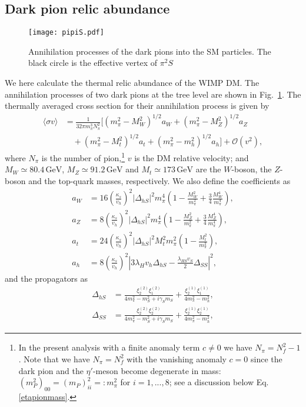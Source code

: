 \documentclass[a4paper,preprint,superscriptaddress,preprintnumbers,nofootinbib]{revtex4}
\newcommand{\al}[1]{\begin{align}#1\end{align}}
\newcommand{\nn}{\nonumber\\}
\newcommand{\fn}[1]{\!\left(#1\right)}
\newcommand{\bra}{\langle}
\newcommand{\ket}{\rangle}
\begin{document}
\subsection{Dark pion relic abundance}
\begin{figure}
\begin{center}
\texttt{[image: pipiS.pdf]}
\end{center}
\caption{Annihilation processes of the dark pions into the SM particles. The black circle is the effective vertex of $\pi^2S$}
\label{s channel diagrams}
\end{figure}
We here calculate the thermal relic abundance of the WIMP DM.
The annihilation processes of two dark pions at the tree level are shown in Fig.~\ref{s channel diagrams}.
The thermally averaged cross section for their annihilation process is given by
\al{
\bra \sigma v\ket
&=\frac{1}{32\pi m_\pi^3N_\pi^2}\bigg[ (m_\pi^2-M_W^2)^{1/2}a_W+(m_\pi^2-M_Z^2)^{1/2}a_Z\nn
&\quad +(m_\pi^2-M_t^2)^{1/2}a_t +(m_\pi^2-m_h^2)^{1/2}a_h\bigg] + {\mathcal O}\fn{v^2},
}
where $N_\pi$ is the number of pion,\footnote{
In the present analysis with a finite anomaly term $c\neq 0$ we have $N_\pi=N_f^2-1$.
Note that we have $N_\pi=N_f^2$ with the vanishing anomaly $c=0$ since the dark pion and the $\eta'$-meson become degenerate in mass: $(m_P^2)_{00}=(m_P)_{ii}^2=:m_\pi^2$ for $i=1,...,8$; see a discussion below Eq.\,\eqref{etapionmass}.} 
$v$ is the DM relative velocity; and $M_W\simeq 80.4\,\text{GeV}$, $M_Z\simeq 91.2\,\text{GeV}$ and $M_t\simeq 173\,\text{GeV}$ are the $W$-boson, the $Z$-boson and the top-quark masses, respectively.
We also define the coefficients as
\al{
a_W&=16\left(\frac{\kappa_s}{v_h}\right)^2 |\Delta_{hS}|^2m_\pi^4\left(1 -\frac{M_W^2}{m_\pi^2} + \frac{3}{4}\frac{M_W^4}{m_\pi^4}\right),\\
a_Z&=8\left(\frac{\kappa_s}{v_h}\right)^2 |\Delta_{hS}|^2m_\pi^4 \left(1-\frac{M_Z^2}{m_\pi^2} +\frac{3}{4}\frac{M_Z^4}{m_\pi^4} \right),\\
a_t&=24\left( \frac{\kappa_s}{v_h}\right)^2|\Delta_{hS}|^2M_t^2 m_\pi^2 \left(1-\frac{M_t^2}{m_\pi^2}\right),\\
a_h&=8\left( \frac{\kappa_s}{v_h}\right)^2 \left| 3\lambda_H v_h\Delta_{hS}-\frac{\lambda_{HS}v_S}{2}\Delta_{SS}\right|^2,
}
and the propagators as
\al{
\Delta_{hS}&=\frac{\xi_2^{(2)}\xi_1^{(2)}}{4m_\pi^2-m_S^2+i\gamma_S m_S}+\frac{\xi_2^{(1)}\xi_1^{(1)}}{4m_\pi^2-m_h^2},
\label{propagatorhs}
\\
\Delta_{SS}&=\frac{\xi_2^{(2)}\xi_2^{(2)}}{4m_\pi^2-m_S^2+i\gamma_S m_S}+\frac{\xi_2^{(1)}\xi_2^{(1)}}{4m_\pi^2-m_h^2},
\label{propagatorss}
}
\end{document}
